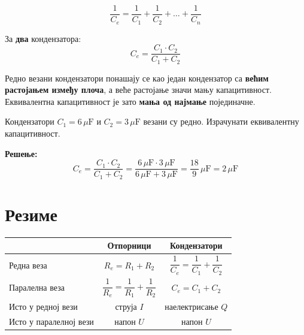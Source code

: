 \documentclass[12pt]{article}
\begin{document}
\begin{kljucno}
\[
\frac{1}{C_e} = \frac{1}{C_1} + \frac{1}{C_2} + \dots + \frac{1}{C_n}
\]
\end{kljucno}

За \textbf{два} кондензатора:
\[
C_e = \frac{C_1 \cdot C_2}{C_1 + C_2}
\]

Редно везани кондензатори понашају се као један кондензатор са \textbf{већим
растојањем између плоча}, а веће растојање значи мању капацитивност.
Еквивалентна капацитивност је зато \textbf{мања од најмање} појединачне.

\begin{primer}
Кондензатори $C_1 = 6\,\mu\text{F}$ и $C_2 = 3\,\mu\text{F}$ везани су редно.
Израчунати еквивалентну капацитивност.

\textbf{Решење:}
\[
C_e = \frac{C_1 \cdot C_2}{C_1 + C_2}
    = \frac{6\,\mu\text{F} \cdot 3\,\mu\text{F}}{6\,\mu\text{F} + 3\,\mu\text{F}}
    = \frac{18}{9}\,\mu\text{F} = 2\,\mu\text{F}
\]
\end{primer}



\section{Резиме}

\begin{center}
\renewcommand{\arraystretch}{2}
\begin{tabular}{lcc}
    \toprule
                          & \textbf{Отпорници}
                          & \textbf{Кондензатори} \\
    \midrule
    Редна веза            & $R_e = R_1 + R_2$
                          & $\dfrac{1}{C_e} = \dfrac{1}{C_1} + \dfrac{1}{C_2}$ \\
    Паралелна веза        & $\dfrac{1}{R_e} = \dfrac{1}{R_1} + \dfrac{1}{R_2}$
                          & $C_e = C_1 + C_2$ \\
    Исто у редној вези    & струја $I$     & наелектрисање $Q$ \\
    Исто у паралелној вези & напон $U$     & напон $U$ \\
    \bottomrule
\end{tabular}
\end{center}
\end{document}
